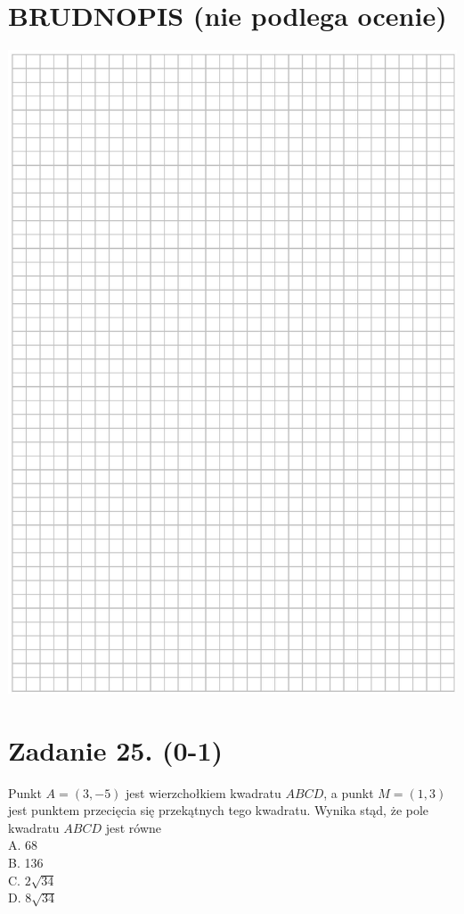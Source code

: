 \documentclass[10pt]{article}
\begin{document}
\section*{BRUDNOPIS (nie podlega ocenie)}
\begin{center}
\includegraphics[max width=\textwidth]{2024_11_21_46d945490f1b2eff1c8eg-13}
\end{center}

\section*{Zadanie 25. (0-1)}
Punkt \(A=(3,-5)\) jest wierzchołkiem kwadratu \(A B C D\), a punkt \(M=(1,3)\) jest punktem przecięcia się przekątnych tego kwadratu. Wynika stąd, że pole kwadratu \(A B C D\) jest równe\\
A. 68\\
B. 136\\
C. \(2 \sqrt{34}\)\\
D. \(8 \sqrt{34}\)
\end{document}
